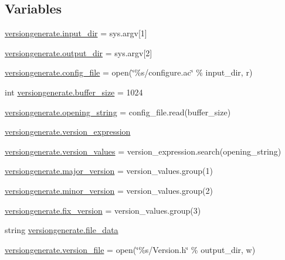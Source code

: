 \subsection*{Variables}
\begin{DoxyCompactItemize}
\item 
\mbox{\hyperlink{namespaceversiongenerate_a68af424183a162a61507cdc378cf255e}{versiongenerate.\+input\+\_\+dir}} = sys.\+argv\mbox{[}1\mbox{]}
\item 
\mbox{\hyperlink{namespaceversiongenerate_aab714e0aa9036025ba7c83eb7422c567}{versiongenerate.\+output\+\_\+dir}} = sys.\+argv\mbox{[}2\mbox{]}
\item 
\mbox{\hyperlink{namespaceversiongenerate_afdfd8d6de9b62e742923b2b3326798e6}{versiongenerate.\+config\+\_\+file}} = open(\char`\"{}\%s/configure.\+ac\char`\"{} \% input\+\_\+dir, \textquotesingle{}r\textquotesingle{})
\item 
int \mbox{\hyperlink{namespaceversiongenerate_a5656c48d43f7e869041b6a30c124702e}{versiongenerate.\+buffer\+\_\+size}} = 1024
\item 
\mbox{\hyperlink{namespaceversiongenerate_a88cc36d80d757546e04817490ebb0640}{versiongenerate.\+opening\+\_\+string}} = config\+\_\+file.\+read(buffer\+\_\+size)
\item 
\mbox{\hyperlink{namespaceversiongenerate_a83861e707250395976fdfee3396a0fff}{versiongenerate.\+version\+\_\+expression}}
\item 
\mbox{\hyperlink{namespaceversiongenerate_a0ce22d4ba772e519b000413a3bf5445c}{versiongenerate.\+version\+\_\+values}} = version\+\_\+expression.\+search(opening\+\_\+string)
\item 
\mbox{\hyperlink{namespaceversiongenerate_a4b536109523f1bc805806f8d76ca34ac}{versiongenerate.\+major\+\_\+version}} = version\+\_\+values.\+group(1)
\item 
\mbox{\hyperlink{namespaceversiongenerate_af8027cbccfcda6a243f0544cc3c08b28}{versiongenerate.\+minor\+\_\+version}} = version\+\_\+values.\+group(2)
\item 
\mbox{\hyperlink{namespaceversiongenerate_aa92fb32c5f03f516f3b6224c620b66e4}{versiongenerate.\+fix\+\_\+version}} = version\+\_\+values.\+group(3)
\item 
string \mbox{\hyperlink{namespaceversiongenerate_aa7a8a587902d8dc493945992ec3fcf60}{versiongenerate.\+file\+\_\+data}}
\item 
\mbox{\hyperlink{namespaceversiongenerate_a3cb3deeb1538014cd32e4253fe298e27}{versiongenerate.\+version\+\_\+file}} = open(\char`\"{}\%s/Version.\+h\char`\"{} \% output\+\_\+dir, \textquotesingle{}w\textquotesingle{})
\end{DoxyCompactItemize}
